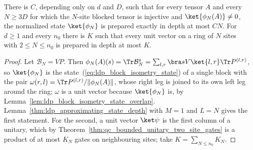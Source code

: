 

\begin{lemma}
    \label{thm:ldp_short_chain_preparation}
    \leanok
    There is $C$, depending only on $d$ and $D$, such that for every tensor $A$
    and every $N\ge3D$ for which the $N$-site blocked tensor is injective and
    $\ket{\phi_N(A)}\neq0$, the normalized state $\ket{\phi_N}$ is prepared
    exactly in depth at most $CN$. For $d\ge1$ and every $n_0$ there is $K$ such
    that every unit vector on a ring of $N$ sites with $2\le N\le n_0$ is
    prepared in depth at most $K$.
\end{lemma}
\begin{proof}
    \leanok
    Let $\mathcal B_N=VP$. Then
    $\phi_N(A)(s)=\Tr\mathcal B_N^s
        =\sum_{l,r}\bra sV\ket{l,r}\Tr P^{(l,r)}$, so $\ket{\phi_N}$ is the
    state~(\ref{eq:ldp_block_isometry_state}) of a single block with the pair
    $\omega(r,l)=\Tr P^{(l,r)}/\lVert\phi_N(A)\rVert$, whose right leg is
    joined to its own left leg around the ring; $\omega$ is a unit vector
    because $\ket{\phi_N}$ is, by Lemma~\ref{lem:ldp_block_isometry_state_overlap}.
    Lemma~\ref{thm:ldp_approximating_state_depth} with $M=1$ and $L=N$ gives
    the first statement. For the second, a unit vector $\ket\psi$ is the first
    column of a unitary, which by
    Theorem~\ref{thm:qc_bounded_unitary_two_site_gates} is a product of at
    most $K_N$ gates on neighbouring sites; take $K=\sum_{N\le n_0}K_N$.
\end{proof}

